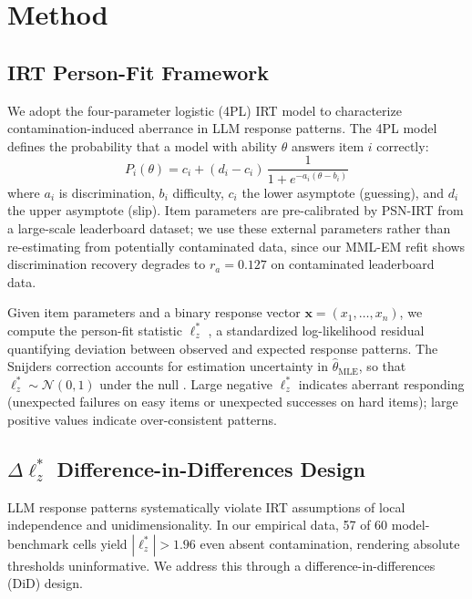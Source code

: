 \section{Method}
\label{sec:method}

\subsection{IRT Person-Fit Framework}
\label{sec:framework}

We adopt the four-parameter logistic (4PL) IRT model to characterize contamination-induced aberrance in LLM response patterns.
The 4PL model defines the probability that a model with ability $\theta$ answers item $i$ correctly:
\begin{equation}
  P_i(\theta) = c_i + (d_i - c_i)\,\frac{1}{1 + e^{-a_i(\theta - b_i)}}
  \label{eq:4pl}
\end{equation}
where $a_i$ is discrimination, $b_i$ difficulty, $c_i$ the lower asymptote (guessing), and $d_i$ the upper asymptote (slip).
Item parameters are pre-calibrated by PSN-IRT \citep{psnirt2026} from a large-scale leaderboard dataset; we use these external parameters rather than re-estimating from potentially contaminated data, since our MML-EM refit shows discrimination recovery degrades to $r_a{=}0.127$ on contaminated leaderboard data.

Given item parameters and a binary response vector $\mathbf{x} = (x_1, \ldots, x_n)$, we compute the person-fit statistic $\ell_z^*$ \citep{snijders2001}, a standardized log-likelihood residual quantifying deviation between observed and expected response patterns.
The Snijders correction accounts for estimation uncertainty in $\hat{\theta}_{\text{MLE}}$, so that $\ell_z^* \sim \mathcal{N}(0,1)$ under the null \citep{drasgow1985}.
Large negative $\ell_z^*$ indicates aberrant responding (unexpected failures on easy items or unexpected successes on hard items); large positive values indicate over-consistent patterns.

\subsection{$\Delta\ell_z^*$ Difference-in-Differences Design}
\label{sec:did}

LLM response patterns systematically violate IRT assumptions of local independence and unidimensionality.
In our empirical data, 57 of 60 model-benchmark cells yield $|\ell_z^*| > 1.96$ even absent contamination, rendering absolute thresholds uninformative.
We address this through a difference-in-differences (DiD) design.

